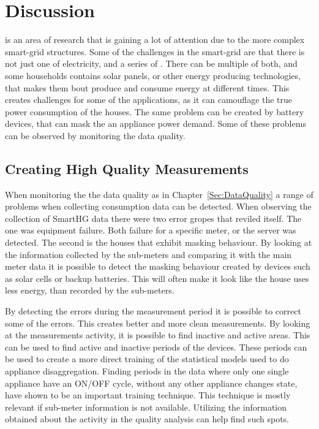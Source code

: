\chapter{Discussion}

 is an area of research that is gaining a lot of attention due to the more complex smart-grid structures. Some of the challenges in the smart-grid are that there is not just one  of electricity, and a series of . There can be multiple of both, and some households contains solar panels, or other energy producing technologies, that makes them bout produce and consume energy at different times. This creates challenges for some of the  applications, as it can camouflage the true power consumption of the houses. The same problem can be created by battery devices, that can mask the an appliance power demand. Some of these problems can be observed by monitoring the data quality.

\section{Creating High Quality Measurements}
When monitoring the the data quality as in Chapter~\ref{Sec:DataQuality} a range of problems when collecting consumption data can be detected. When observing the collection of SmartHG data there were two error gropes that reviled itself. The one was equipment failure. Both failure for a specific meter, or the server was detected. The second is the houses that exhibit masking behaviour. By looking at the information collected by the sub-meters and comparing it with the main meter data it is possible to detect the masking behaviour created by devices such as solar cells or backup batteries. This will often make it look like the house uses less energy, than recorded by the sub-meters. 

By detecting the errors during the measurement period it is possible to correct some of the errors. This creates better and more clean measurements. By looking at the measurements activity, it is possible to find inactive and active areas. This can be used to find active and inactive periods of the devices. These periods can be used to create a more direct training of the statistical models used to do appliance disaggregation. Finding periods in the data where only one single appliance have an ON/OFF cycle, without any other appliance changes state, have shown to be an important training technique. This technique is mostly relevant if sub-meter information is not available. Utilizing the information obtained about the activity in the quality analysis can help find such spots.

